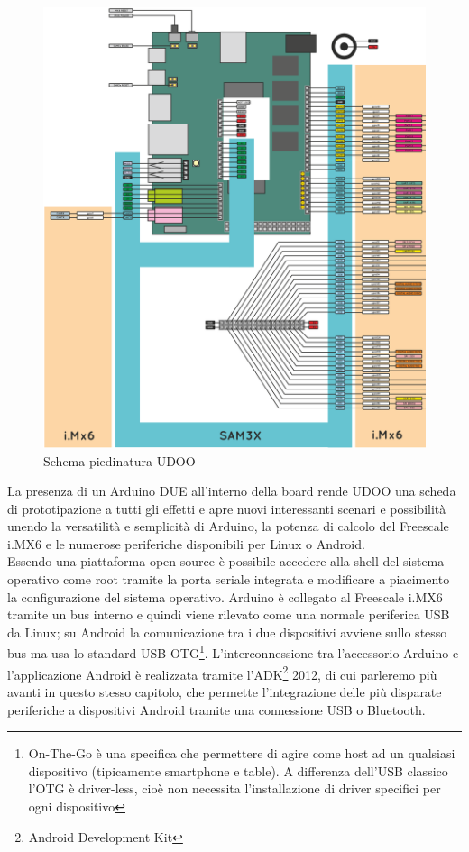 \begin{figure}[!htb] \center
\includegraphics[width=\textwidth]{immagini/udoo_pinout.png}
\caption{Schema piedinatura UDOO} 
\end{figure}

La presenza di un Arduino DUE all'interno della board rende UDOO una scheda di prototipazione a tutti gli effetti e apre nuovi interessanti scenari e possibilità unendo la versatilità e semplicità di Arduino, la potenza di calcolo del Freescale i.MX6 e le numerose periferiche disponibili per Linux o Android.\\
Essendo una piattaforma open-source è possibile accedere alla shell del sistema operativo come root tramite la porta seriale integrata e modificare a piacimento la configurazione del sistema operativo. Arduino è collegato al Freescale i.MX6 tramite un bus interno e quindi viene rilevato come una normale periferica USB da Linux; su Android la comunicazione tra i due dispositivi avviene sullo stesso bus ma usa lo standard USB OTG\footnote{On-The-Go è una specifica che permettere di agire come host ad un qualsiasi  dispositivo (tipicamente smartphone e table). A differenza dell'USB classico l'OTG è driver-less, cioè non necessita l'installazione di driver specifici per ogni dispositivo}. L'interconnessione tra l'accessorio Arduino e l'applicazione Android è realizzata tramite l'ADK\footnote{Android Development Kit} 2012, di cui parleremo più avanti in questo stesso capitolo, che permette l'integrazione delle più disparate periferiche a dispositivi Android tramite una connessione USB o Bluetooth.
